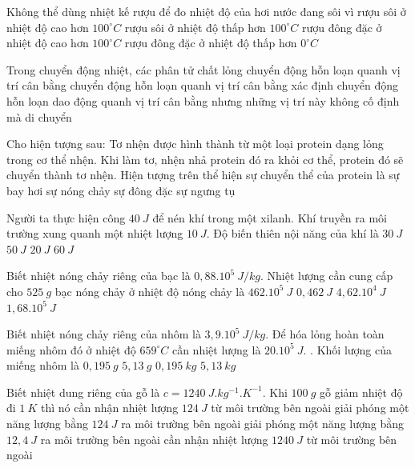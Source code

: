 \begin{ex}%
	Không thể dùng nhiệt kế rượu để đo nhiệt độ của hơi nước đang sôi vì
	\choice
	{rượu sôi ở nhiệt độ cao hơn $100^{\circ}C$}
	{\True rượu sôi ở nhiệt độ thấp hơn $100^{\circ}C$}
	{rượu đông đặc ở nhiệt độ cao hơn $100^{\circ}C$}
	{rượu đông đặc ở nhiệt độ thấp hơn $0^{\circ}C$}
	\loigiai{}
\end{ex}

\begin{ex}%
	Trong chuyển động nhiệt, các phân tử chất lỏng
	\choice
	{chuyển động hỗn loạn quanh vị trí cân bằng}
	{chuyển động hỗn loạn quanh vị trí cân bằng xác định}
	{chuyển động hỗn loạn}
	{\True dao động quanh vị trí cân bằng nhưng những vị trí này không cố định mà di chuyển}
	\loigiai{}
\end{ex}

\begin{ex}
	Cho hiện tượng sau: Tơ nhện được hình thành từ một loại protein dạng lỏng trong cơ thể nhện. Khi làm tơ, nhện nhả protein đó ra khỏi cơ thể, protein đó sẽ chuyển thành tơ nhện. Hiện tượng trên thể hiện sự chuyển thể của protein là
	\choice
	{sự bay hơi}
	{sự nóng chảy}
	{\True sự đông đặc}
	{sự ngưng tụ}
	\loigiai{}
\end{ex}

\begin{ex}
	Người ta thực hiện công $40\ J$ để nén khí trong một xilanh. Khí truyền ra môi trường xung quanh một nhiệt lượng $10\ J$. Độ biến thiên nội năng của khí là
	\choice
	{\True $30\ J$}
	{$50\ J$}
	{$20\ J$}
	{$60\ J$}
	\loigiai{}
\end{ex}

\begin{ex}
	Biết nhiệt nóng chảy riêng của bạc là $0,88.10^5\ J/kg$. Nhiệt lượng cần cung cấp cho $525\ g$ bạc nóng chảy ở nhiệt độ nóng chảy là
	\choice
	{$462.10^5\ J$}
	{$0,462\ J$}
	{\True $4, 62.10^4\ J$}
	{$1, 68.10^5\ J$}	
	\loigiai{}
\end{ex}

\begin{ex}
	Biết nhiệt nóng chảy riêng của nhôm là $3,9.10^5\ J/kg$. Để hóa lỏng hoàn toàn miếng nhôm đó ở nhiệt độ $659^{\circ}C$ cần nhiệt lượng là $20.10^5\ J$. . Khối lượng của miếng nhôm là
	\choice
	{$0,195\ g$}
	{$5,13\ g$}
	{$0,195\ kg$}
	{\True $5,13\ kg$}
	\loigiai{}
\end{ex}

\begin{ex}
	Biết nhiệt dung riêng của gỗ là $c = 1240\  J.kg^{-1}.K^{-1}$. Khi $100\ g$ gỗ giảm nhiệt độ đi $1\ K$ thì nó
	\choice
	{cần nhận nhiệt lượng $124\ J$ từ môi trường bên ngoài}
	{\True giải phóng một năng lượng bằng $124\ J$ ra môi trường bên ngoài}
	{giải phóng một năng lượng bằng $12,4\ J$ ra môi trường bên ngoài}
	{cần nhận nhiệt lượng $1240\ J$ từ môi trường bên ngoài}
	\loigiai{}
\end{ex}

